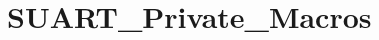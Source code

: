 \hypertarget{group___s_u_a_r_t___private___macros}{}\section{S\+U\+A\+R\+T\+\_\+\+Private\+\_\+\+Macros}
\label{group___s_u_a_r_t___private___macros}
